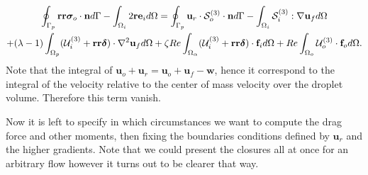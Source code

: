 \begin{multline}
    \intS[p]{\textbf{rr}  \bm\sigma_{o}\cdot \textbf{n}}
    - \intO[i]{2\textbf{re}_i }
    =
    \intS[p]{\textbf{u}_{r}\cdot \mathcal{S}_o^{(3)}\cdot \textbf{n}}
    - \intO[i]{\mathcal{S}_i^{(3)} :\grad\textbf{u}_f}\\
    + (\lambda-1) \intO[p]{(\mathcal{U}_{i}^{(3)} + \textbf{rr}\bm\delta) \cdot \grad^2 \textbf{u}_f }
    + \zeta Re \intO{(\mathcal{U}_{i}^{(3)} + \textbf{rr}\bm\delta)\cdot \textbf{f}_{i}} 
    + Re\intO[o]{\mathcal{U}_{o}^{(3)} \cdot \textbf{f}_{o}}.
\end{multline}
Note that the integral of $\textbf{u}_o + \textbf{u}_r = \textbf{u}_o+\textbf{u}_f - \textbf{w}$, hence it correspond to the integral of the velocity relative to the center of mass velocity over the droplet volume. Therefore this term vanish. 

Now it is left to specify in which circumstances we want to compute the drag force and other moments, then fixing the boundaries conditions defined by $\textbf{u}_r$ and the higher gradients. 
Note that we could present the closures all at once for an arbitrary flow however it turns out to be clearer that way. 


